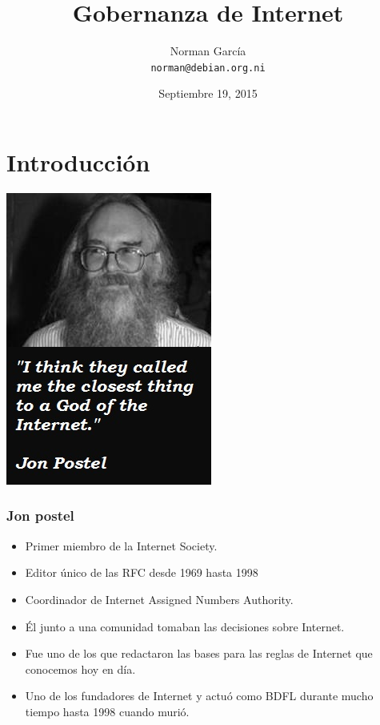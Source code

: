 \documentclass{beamer}
\title{Gobernanza de Internet}
\author[n0rman]{Norman Garc\'ia \\ \texttt{norman@debian.org.ni}}
\institute{Debian Nicaragua}
\date{Septiembre 19, 2015}
\begin{document}
\begin{frame}
	\titlepage
\end{frame}



\section{Introducci\'on}


\begin{frame}
	\begin{center}
	            \includegraphics[scale=0.90]{../img/jon-postel.jpg}
	\end{center}	
\end{frame}


\begin{frame}
\frametitle{Jon postel}
	\begin{itemize}	
		\pause \item Primer miembro de la Internet Society.
		\pause \item Editor \'unico de las \alert{RFC} desde 1969 hasta 1998
		\pause \item Coordinador de \alert{I}nternet \alert{A}ssigned \alert{N}umbers \alert{A}uthority.
		\pause \item \'El junto a una comunidad tomaban las decisiones sobre Internet.
		\pause \item Fue uno de los que redactaron las bases para las reglas de Internet que conocemos hoy en d\'ia.
		\pause \item Uno de los fundadores de Internet y actu\'o como BDFL durante mucho tiempo hasta 1998 cuando muri\'o.
	\end{itemize}
\end{frame}
\end{document}
